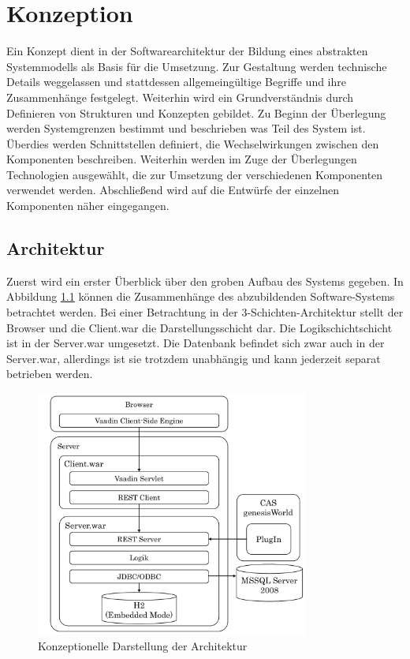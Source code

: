 
\chapter{Konzeption}
\label{ch:Konzeption}

Ein Konzept dient in der Softwarearchitektur der Bildung eines abstrakten Systemmodells als Basis für die Umsetzung. Zur Gestaltung werden technische Details weggelassen und stattdessen allgemeingültige Begriffe und ihre Zusammenhänge festgelegt. Weiterhin wird ein Grundverständnis durch Definieren von Strukturen und Konzepten gebildet. Zu Beginn der Überlegung werden Systemgrenzen bestimmt und beschrieben was Teil des System ist. Überdies werden Schnittstellen definiert, die Wechselwirkungen zwischen den Komponenten beschreiben. Weiterhin werden im Zuge der Überlegungen Technologien ausgewählt, die zur Umsetzung der verschiedenen Komponenten verwendet werden. Abschließend wird auf die Entwürfe der einzelnen Komponenten näher eingegangen.  

\section{Architektur}

Zuerst wird ein erster Überblick über den groben Aufbau des Systems gegeben. In Abbildung \ref{konzept_architektur} können die Zusammenhänge des abzubildenden Software-Systems betrachtet werden. Bei einer Betrachtung in der 3-Schichten-Architektur stellt der Browser und die Client.war die Darstellungsschicht dar. Die Logikschichtschicht ist in der Server.war umgesetzt. Die Datenbank befindet sich zwar auch in der Server.war, allerdings ist sie trotzdem unabhängig und kann jederzeit separat betrieben werden.

\begin{figure}[htbp]
\centering
  \includegraphics[width=0.8\textwidth, width=0.8\textwidth]{pics/Konzept_architektur.pdf}
\caption{Konzeptionelle Darstellung der Architektur}
\label{konzept_architektur}
\end{figure} 

